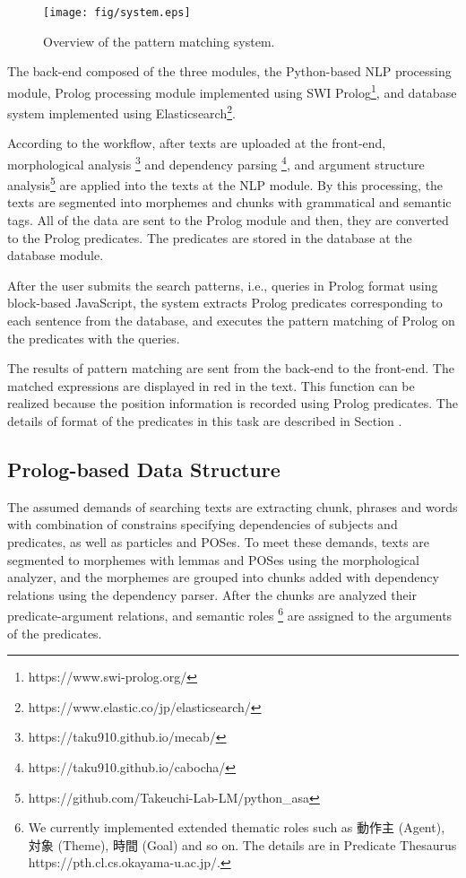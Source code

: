 \documentclass[conference]{IEEEtran}
\begin{document}
\begin{figure}[htbp]
\centerline{\texttt{[image: fig/system.eps]}}
\caption{Overview of the pattern matching system.}
\label{fig:sys}
\end{figure}

The back-end composed of the three modules, the Python-based NLP processing module,
Prolog processing module implemented using SWI Prolog\footnote{https://www.swi-prolog.org/},
and database system implemented using Elasticsearch\footnote{https://www.elastic.co/jp/elasticsearch/}.

According to the workflow, after texts are uploaded at the front-end,
morphological analysis \footnote{https://taku910.github.io/mecab/} and
dependency parsing \footnote{https://taku910.github.io/cabocha/}, and
argument structure analysis\footnote{https://github.com/Takeuchi-Lab-LM/python\_asa}
\cite{take2011f} are applied into the texts at the NLP module.
By this processing, the texts are segmented into morphemes and
chunks with grammatical and semantic tags. 
All of the data are sent to the Prolog module and then, they are converted
to the Prolog predicates. The predicates are stored in the database at the database module.

After the user submits the search patterns, i.e., queries in Prolog format using block-based JavaScript,
the system extracts Prolog predicates corresponding to each sentence from the database, and executes the
pattern matching of Prolog on the predicates with the queries. 

The results of pattern matching are sent from the back-end to the front-end.
The matched expressions are displayed in red in the text.
This function can be realized because the position information is recorded 
using Prolog predicates. The details of format of the predicates
in this task are described in Section \label{sec:prolog}. 


\subsection{Prolog-based Data Structure} 
\label{sec:prolog}
The assumed demands of searching texts are extracting chunk, phrases and words with 
combination of constrains specifying dependencies of subjects and predicates, as well as particles and POSes.
To meet these demands, texts are segmented to morphemes with lemmas and POSes using the morphological analyzer, and
the morphemes are grouped into chunks added with dependency relations using the dependency parser.
After the chunks are analyzed their predicate-argument relations, and semantic roles \footnote{We
currently implemented extended thematic roles\cite{fillmore68,take2011f} such as 動作主 (Agent), 対象 (Theme), 時間 (Goal) and so on. The details are in Predicate Thesaurus https://pth.cl.cs.okayama-u.ac.jp/. } are assigned to the arguments of the predicates. 
\end{document}
